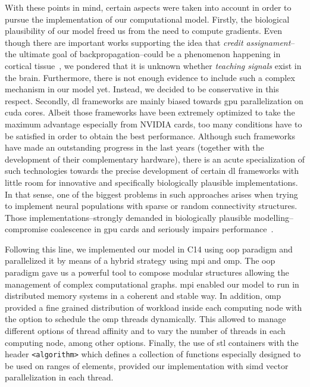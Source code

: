 \documentclass[10pt,journal,compsoc]{IEEEtran}
\newcommand{\CC}{C\nolinebreak\hspace{-.05em}\raisebox{.4ex}{\tiny\bf +}\nolinebreak\hspace{-.10em}\raisebox{.4ex}{\tiny\bf +}}
\begin{document}
With these points in mind, certain aspects were taken into account in order to pursue the implementation of our computational model. Firstly, the biological plausibility of our model freed us from the need to compute gradients. Even though there are important works supporting the idea that \emph{credit assignament}--the ultimate goal of backpropagation--could be a phenomenon happening in cortical tissue~\cite{Guerguiev2017TowardsDL}, we pondered that it is unknown whether \emph{teaching signals} exist in the brain. Furthermore, there is not enough evidence to include such a complex mechanism in our model yet. Instead, we decided to be conservative in this respect. Secondly, \gls{dl} frameworks are mainly biased towards \gls{gpu} parallelization on \gls{cuda} cores. Albeit those frameworks have been extremely optimized to take the maximum advantage especially from NVIDIA cards, too many conditions have to be satisfied in order to obtain the best performance. Although such frameworks have made an outstanding progress in the last years (together with the development of their complementary hardware), there is an acute specialization of such technologies towards the precise development of certain \gls{dl} frameworks with little room for innovative and specifically biologically plausible implementations. In that sense, one of the biggest problems in such approaches arises when trying to implement neural populations with sparse or random connectivity structures. Those implementations--strongly demanded in biologically plausible modelling--compromise coalescence in \gls{gpu} cards and seriously impairs performance~\cite{doi:10.3109/0954898X.2012.739292}.

Following this line, we implemented our model in \CC14 using \gls{oop} paradigm and parallelized it by means of a hybrid strategy using \gls{mpi} and \gls{omp}. The \gls{oop} paradigm gave us a powerful tool to compose modular structures allowing the management of complex computational graphs. \gls{mpi} enabled our model to run in distributed memory systems in a coherent and stable way. In addition, \gls{omp} provided a fine grained distribution of  workload inside each computing node with the option to schedule the \gls{omp} threads dynamically. This allowed to manage different options of thread affinity and to vary the number of threads in each computing node, among other options. Finally, the use of \gls{stl} containers with the header \texttt{<algorithm>} which defines a collection of functions especially designed to be used on ranges of elements, provided our implementation with \gls{simd} vector parallelization in each thread.
\end{document}
